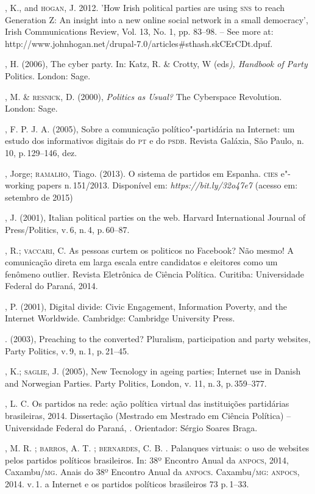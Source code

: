 \begin{bibliohedra}
, K., and \textsc{hogan}, J. 2012. 'How Irish political parties are using
\textsc{sns} to reach Generation Z: An insight into a new online social network
in a small democracy', Irish Communications Review, Vol. 13, No. 1, pp.
83--98. -- See more at:
http://www.johnhogan.net/drupal-7.0/articles\#sthash.skCErCDt.dpuf.

, H. (2006), The cyber party. In: Katz, R. \& Crotty, W
(eds\emph{), Handbook of Party} Politics. London: Sage.

, M. \& \textsc{resnick}, D. (2000), \emph{Politics as Usual?} The
Cyberspace Revolution. London: Sage.

, F. P. J. A. (2005), Sobre a comunicação político"-partidária na
Internet: um estudo dos informativos digitais do \textsc{pt} e do \textsc{psdb}. Revista
Galáxia, São Paulo, n.\,10, p.\,129--146, dez.

, Jorge; \textsc{ramalho}, Tiago. (2013). O sistema de partidos em Espanha.
\textsc{cies} e"-working papers n.\,151/2013. Disponível em:
\emph{https://bit.ly/32o47e7}
(acesso em: setembro de 2015)

, J. (2001), Italian political parties on the web. Harvard
International Journal of Press/Politics, v.\,6, n.\,4, p.\,60--87.

, R.; \textsc{vaccari}, C. As pessoas curtem os politicos no Facebook? Não
mesmo! A comunicação direta em larga escala entre candidatos e eleitores
como um fenômeno outlier. Revista Eletrônica de Ciência Política.
Curitiba: Universidade Federal do Paraná, 2014.

, P. (2001), Digital divide: Civic Engagement, Information
Poverty, and the Internet Worldwide. Cambridge: Cambridge University
Press.

\titidem. (2003), Preaching to the converted? Pluralism, participation
and party websites, Party Politics, v.\,9, n.\,1, p.\,21--45.

, K.; \textsc{saglie}, J. (2005), New Tecnology in ageing parties;
Internet use in Danish and Norwegian Parties. Party Politics, London, v.
11, n.\,3, p.\,359--377.

, L. C. Os partidos na rede: ação política virtual das instituições
partidárias brasileiras, 2014. Dissertação (Mestrado em Mestrado em
Ciência Política) -- Universidade Federal do Paraná, . Orientador:
Sérgio Soares Braga.

, M. R. ; \textsc{barros}, A. T. ; \textsc{bernardes}, C. B. . Palanques
virtuais: o uso de websites pelos partidos políticos brasileiros. In:
38º Encontro Anual da \textsc{anpocs}, 2014, Caxambu/\textsc{mg}. Anais do 38º Encontro
Anual da \textsc{anpocs}. Caxambu/\textsc{mg}: \textsc{anpocs}, 2014. v.\,1. a Internet e os
partidos políticos brasileiros 73 p.\,1--33.


\end{bibliohedra}
